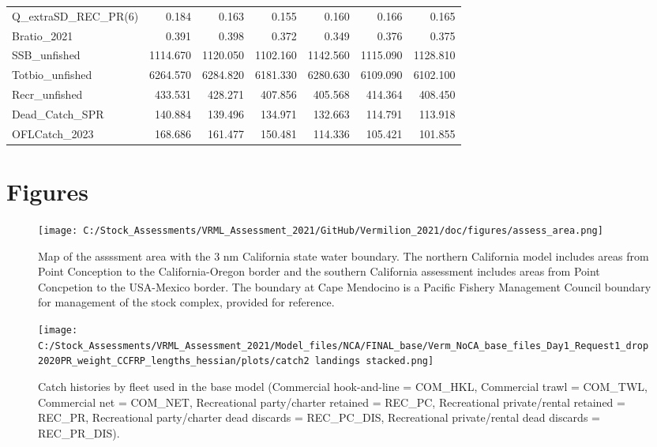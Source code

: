 \documentclass[11pt,
  english,
]{article}
\begin{document}
\begin{landscape}
\begin{table}
\begin{tabular}[t]{lrrrrrr}
Q\_extraSD\_REC\_PR(6) & 0.184 & 0.163 & 0.155 & 0.160 & 0.166 & 0.165\\
Bratio\_2021 & 0.391 & 0.398 & 0.372 & 0.349 & 0.376 & 0.375\\
SSB\_unfished & 1114.670 & 1120.050 & 1102.160 & 1142.560 & 1115.090 & 1128.810\\
Totbio\_unfished & 6264.570 & 6284.820 & 6181.330 & 6280.630 & 6109.090 & 6102.100\\
Recr\_unfished & 433.531 & 428.271 & 407.856 & 405.568 & 414.364 & 408.450\\
Dead\_Catch\_SPR & 140.884 & 139.496 & 134.971 & 132.663 & 114.791 & 113.918\\
OFLCatch\_2023 & 168.686 & 161.477 & 150.481 & 114.336 & 105.421 & 101.855\\
\bottomrule
\end{tabular}
\end{table}
\end{landscape}


\hypertarget{figures}{%
\section*{Figures}\label{figures}}

\leavevmode\tagmcend\tagstructend

\begin{figure}
\centering
\texttt{[image: C:/Stock\_Assessments/VRML\_Assessment\_2021/GitHub/Vermilion\_2021/doc/figures/assess\_area.png]}
\caption{Map of the assssment area with the 3 nm California state water boundary. The northern California model includes areas from Point Conception to the California-Oregon border and the southern California assessment includes areas from Point Concpetion to the USA-Mexico border. The boundary at Cape Mendocino is a Pacific Fishery Management Council boundary for management of the stock complex, provided for reference.\label{fig:assess-area}}
\end{figure}

\begin{figure}
\centering
\texttt{[image: C:/Stock\_Assessments/VRML\_Assessment\_2021/Model\_files/NCA/FINAL\_base/Verm\_NoCA\_base\_files\_Day1\_Request1\_drop2020PR\_weight\_CCFRP\_lengths\_hessian/plots/catch2 landings stacked.png]}
\caption{Catch histories by fleet used in the base model (Commercial hook-and-line = COM\_HKL, Commercial trawl = COM\_TWL, Commercial net = COM\_NET, Recreational party/charter retained = REC\_PC, Recreational private/rental retained = REC\_PR, Recreational party/charter dead discards = REC\_PC\_DIS, Recreational private/rental dead discards = REC\_PR\_DIS).\label{fig:catch}}
\end{figure}
\end{document}
